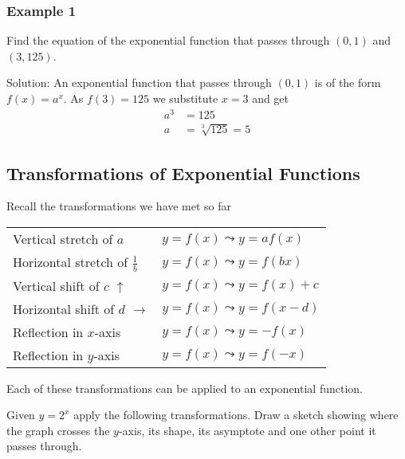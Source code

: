 \subsubsection{Example 1}
Find the equation of the exponential function that passes through $\left (0 ,1\right )$ and $\left (3 ,125\right )$. 

Solution: An
exponential function that passes through $\left (0 ,1\right )$ is of the form $f (x) =a^{x}$. As $f (3) =125$ we substitute $x =3$ and get
\begin{align*}a^{3} &  = 125 \\
a &  = \sqrt[{3}]{125} =5\end{align*}

\subsection{Transformations of Exponential Functions}
Recall the transformations we have met so far 


\begin{tabular}[c]{ll}Vertical stretch of $a$  & $y =f (x) \leadsto y =a f (x)$  \\
Horizontal stretch of $\frac{1}{b}$  & $y =f (x) \leadsto y =f (b x)$  \\
Vertical shift of $c$ $\uparrow $  & $y =f (x) \leadsto y =f (x) +c$  \\
Horizontal shift of $d$ $ \longrightarrow $  & $y =f (x) \leadsto y =f (x -d)$  \\
Reflection in $x$-axis  & $y =f (x) \leadsto y = -f (x)$  \\
Reflection in $y$-axis  & $y =f (x) \leadsto y =f ( -x)$
\end{tabular}

Each of these transformations can be applied to an exponential
function. 

Given $y =2^{x}$ apply the following transformations. Draw a sketch showing where the graph crosses the
$y$-axis, its shape, its asymptote and one other point it passes through. 


